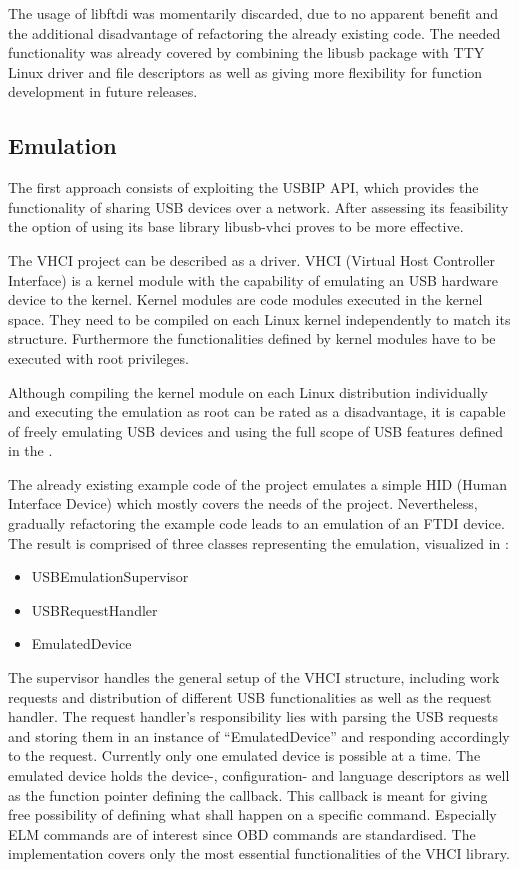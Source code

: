 The usage of libftdi was momentarily discarded, due to no apparent benefit and the additional disadvantage of refactoring the already existing 
code. The needed functionality was already covered by combining the libusb package with TTY Linux driver and file descriptors as well as giving more
flexibility for function development in future releases.

\subsection{Emulation}
\label{sec:emulation}
The first approach consists of exploiting the USBIP API, which provides the functionality of sharing USB devices over a network. After 
assessing its feasibility the option of using its base library libusb-vhci proves to be more effective.

The VHCI project can be described as a driver. VHCI \cite{VHCI} (Virtual Host Controller Interface) is a kernel module with the capability of emulating an 
USB hardware device to the kernel. Kernel modules are code modules executed in the kernel space. They need to be compiled on each Linux kernel 
independently to match its structure. Furthermore the functionalities defined by kernel modules have to be executed with root privileges.

Although compiling the kernel module on each Linux distribution individually and executing the emulation as root can be rated as a disadvantage,
it is capable of freely emulating USB devices and using the full scope of USB features defined in the  \cite{USB}. 

The already existing example code of the project emulates a simple HID (Human Interface Device) which mostly covers the needs of the project. 
Nevertheless, gradually refactoring the example code leads to an emulation of an FTDI device. The result is comprised of three classes 
representing the emulation, visualized in :

\begin{itemize}
 \item USBEmulationSupervisor
 \item USBRequestHandler
 \item EmulatedDevice
\end{itemize}

The supervisor handles the general setup of the VHCI structure, including work requests and distribution of different USB functionalities as 
well as the request handler. The request handler’s responsibility lies with parsing the USB requests and storing them in an instance of 
“EmulatedDevice” and responding accordingly to the request. Currently only one emulated device is possible at a time. The emulated device holds 
the device-, configuration- and language descriptors as well as the function pointer defining the callback. This callback is meant for giving 
free possibility of defining what shall happen on a specific command. Especially ELM commands are of interest since OBD commands are 
standardised. The implementation covers only the most essential functionalities of the VHCI library.

